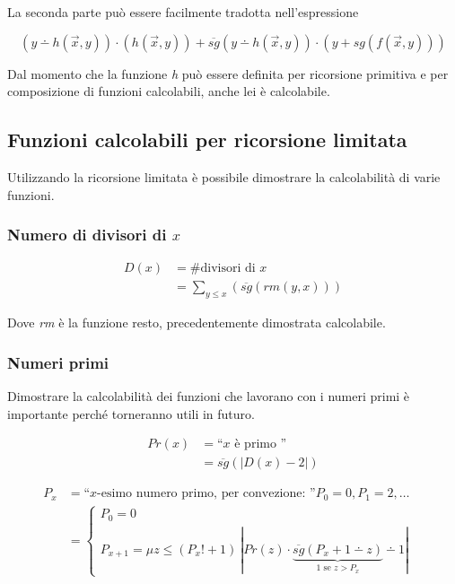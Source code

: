 La seconda parte può essere facilmente tradotta nell'espressione

$$
(y \dotminus h(\vec{x},y)) \cdot (h(\vec{x},y)) + \overline{sg}(y \dotminus h(\vec{x},y)) \cdot (y + sg(f(\vec{x},y)))
$$

Dal momento che la funzione \textit{h} può essere definita per ricorsione primitiva e per composizione di funzioni calcolabili, anche lei è calcolabile.

\subsection{Funzioni calcolabili per ricorsione limitata}

Utilizzando la ricorsione limitata è possibile dimostrare la calcolabilità di varie funzioni.

\subsubsection{Numero di divisori di $x$}

\begin{align*}
	D(x) &= \text{\# divisori di } x \\
			&= \sum_{y \leq x}(\overline{sg}(rm(y,x))) 
\end{align*}

Dove \textit{rm} è la funzione resto, precedentemente dimostrata calcolabile.

\subsubsection{Numeri primi}

Dimostrare la calcolabilità dei funzioni che lavorano con i numeri primi è importante perché torneranno utili in futuro.

\begin{align*}
	Pr(x) &= \text{``$x$ è primo ''} \\
			 &= \overline{sg}(|D(x) - 2|)
\end{align*}

\begin{align*}
	P_x &= \text{``$x$-esimo numero primo, per convezione: ''} P_0 = 0, P_1 = 2, \ldots \\
	&= \begin{cases}
	P_0 = 0& \\
	P_{x+1} = \mu z \leq (P_x! + 1) \: | Pr(z) \cdot \underbrace{\overline{sg}(P_x +1 \dotminus z)}_{1 \text{ se } z > P_x  } \dotminus 1| &
	\end{cases}
\end{align*}

